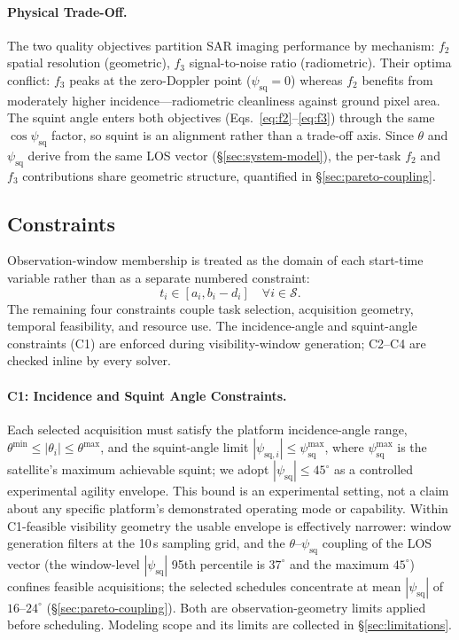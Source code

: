 \documentclass[preprint,12pt,authoryear]{elsarticle}
\begin{document}
\paragraph{Physical Trade-Off.}
The two quality objectives partition SAR imaging performance by mechanism: $f_2$ spatial
resolution (geometric), $f_3$ signal-to-noise ratio (radiometric). Their optima conflict:
$f_3$ peaks at the zero-Doppler point ($\psi_{\text{sq}} = 0$) whereas $f_2$ benefits from
moderately higher incidence---radiometric cleanliness against ground pixel area. The
squint angle enters both objectives (Eqs.~\ref{eq:f2}--\ref{eq:f3}) through the same
$\cos\psi_{\text{sq}}$ factor, so squint is an alignment rather than a trade-off axis.
Since $\theta$ and $\psi_{\text{sq}}$ derive from the same LOS vector
(\S\ref{sec:system-model}), the per-task $f_2$ and $f_3$ contributions share geometric
structure, quantified in \S\ref{sec:pareto-coupling}.
\subsection{Constraints}\label{sec:constraints}
Observation-window membership is treated as the domain of each start-time
variable rather than as a separate numbered constraint:
\begin{equation}
t_i \in [a_i, b_i - d_i] \quad \forall i \in \mathcal{S}.
\label{eq:observation-domain}
\end{equation}
The remaining four constraints couple task selection, acquisition geometry,
temporal feasibility, and resource use. The incidence-angle and squint-angle
constraints (C1) are enforced during visibility-window generation; C2--C4 are checked
inline by every solver.

\paragraph{C1: Incidence and Squint Angle Constraints.}
Each selected acquisition must satisfy the platform incidence-angle range,
$\theta^{\min} \leq |\theta_i| \leq \theta^{\max}$, and the squint-angle limit
$|\psi_{\text{sq},i}| \leq \psi_{\text{sq}}^{\max}$, where $\psi_{\text{sq}}^{\max}$
is the satellite's maximum achievable squint; we adopt $|\psi_{\text{sq}}| \leq 45^\circ$
as a controlled experimental agility envelope. This bound is an experimental
setting, not a claim about any specific platform's demonstrated operating
mode or capability.
Within C1-feasible visibility geometry the usable envelope is effectively
narrower: window generation filters at the 10\,s sampling grid, and the
$\theta$--$\psi_{\text{sq}}$ coupling of the LOS vector (the window-level
$|\psi_{\text{sq}}|$ 95th percentile is $37^\circ$ and the maximum $45^\circ$)
confines feasible acquisitions; the selected
schedules concentrate at mean $|\psi_{\text{sq}}|$ of $16$--$24^\circ$
(\S\ref{sec:pareto-coupling}).
Both are observation-geometry limits applied before scheduling.
Modeling scope and its limits are collected in \S\ref{sec:limitations}.
\end{document}
